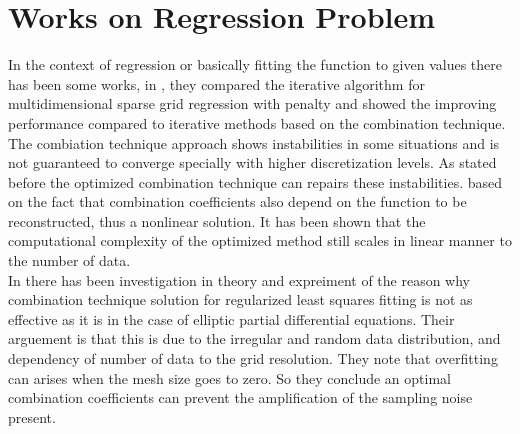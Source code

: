 \section{Works on Regression Problem}
In the context of regression or basically fitting the function to given values there has been some works, in \cite{Hegland2002}, they compared the iterative algorithm for multidimensional sparse grid regression with penalty and showed the improving performance compared to iterative methods based on the combination technique.\\
The combiation technique approach shows instabilities in some situations and is not guaranteed to converge specially with higher discretization levels. As stated before the optimized combination technique can repairs these instabilities. based on the fact that combination coefficients also depend on the function to be reconstructed, thus a nonlinear solution. It has been shown that the computational complexity of the optimized method still scales in linear manner to the number of data.\cite{Garcke2006}\\
In \cite{Garcke2009} there has been investigation in theory and expreiment of the reason why combination technique solution for regularized least squares fitting is not as effective as it is in the case of elliptic partial differential equations. Their arguement is that this is due to the irregular and random data distribution, and dependency of number of data to the grid resolution. They note that overfitting can arises when the mesh size goes to zero. So they conclude an optimal combination coefficients can prevent the amplification of the sampling noise present.\\
